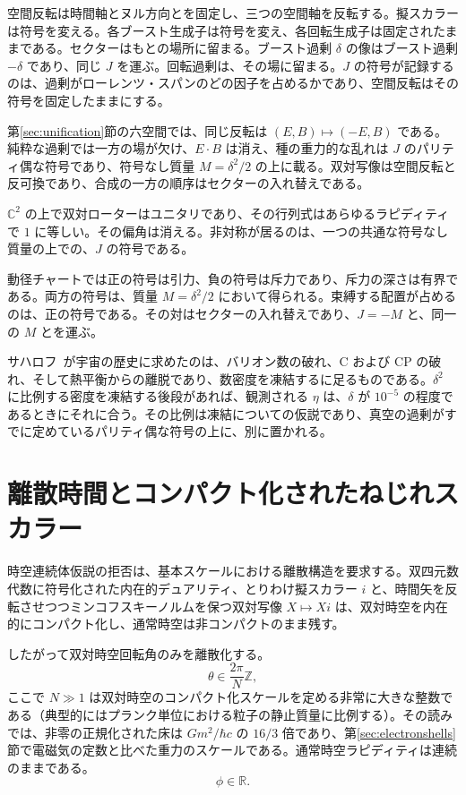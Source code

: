 \documentclass[a4paper]{article}
\begin{document}
空間反転は時間軸とヌル方向とを固定し、三つの空間軸を反転する。擬スカラーは符号を変える。各ブースト生成子は符号を変え、各回転生成子は固定されたままである。セクターはもとの場所に留まる。ブースト過剰 $\delta$ の像はブースト過剰 $-\delta$ であり、同じ $J$ を運ぶ。回転過剰は、その場に留まる。$J$ の符号が記録するのは、過剰がローレンツ・スパンのどの因子を占めるかであり、空間反転はその符号を固定したままにする。

第\ref{sec:unification}節の六空間では、同じ反転は $(E,B)\mapsto(-E,B)$ である。純粋な過剰では一方の場が欠け、$E\cdot B$ は消え、種の重力的な乱れは $J$ のパリティ偶な符号であり、符号なし質量 $M=\delta^2/2$ の上に載る。双対写像は空間反転と反可換であり、合成の一方の順序はセクターの入れ替えである。

$\mathbb{C}^2$ の上で双対ローターはユニタリであり、その行列式はあらゆるラピディティで $1$ に等しい。その偏角は消える。非対称が居るのは、一つの共通な符号なし質量の上での、$J$ の符号である。

動径チャートでは正の符号は引力、負の符号は斥力であり、斥力の深さは有界である。両方の符号は、質量 $M=\delta^2/2$ において得られる。束縛する配置が占めるのは、正の符号である。その対はセクターの入れ替えであり、$J=-M$ と、同一の $M$ とを運ぶ。

サハロフ~\cite{sakharov1967}が宇宙の歴史に求めたのは、バリオン数の破れ、$\mathrm{C}$ および $\mathrm{CP}$ の破れ、そして熱平衡からの離脱であり、数密度を凍結するに足るものである。$\delta^2$ に比例する密度を凍結する後段があれば、観測される $\eta$ は、$\delta$ が $10^{-5}$ の程度であるときにそれに合う。その比例は凍結についての仮説であり、真空の過剰がすでに定めているパリティ偶な符号の上に、別に置かれる。

\section{離散時間とコンパクト化されたねじれスカラー}
\label{sec:discretetime}

時空連続体仮説の拒否は、基本スケールにおける離散構造を要求する。双四元数代数に符号化された内在的デュアリティ、とりわけ擬スカラー $i$ と、時間矢を反転させつつミンコフスキーノルムを保つ双対写像 $X \mapsto Xi$ は、双対時空を内在的にコンパクト化し、通常時空は非コンパクトのまま残す。

したがって双対時空回転角のみを離散化する。
\[
\theta \in \frac{2\pi}{N} \mathbb{Z},
\]
ここで $N \gg 1$ は双対時空のコンパクト化スケールを定める非常に大きな整数である（典型的にはプランク単位における粒子の静止質量に比例する）。その読みでは、非零の正規化された床は \(G m^2/\hbar c\) の \(16/3\) 倍であり、第\ref{sec:electronshells}節で電磁気の定数と比べた重力のスケールである。通常時空ラピディティは連続のままである。
\[
\phi \in \mathbb{R}.
\]
\end{document}
